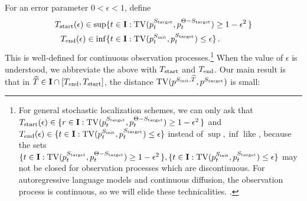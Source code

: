 For an error parameter $0 < \epsilon < 1$, define
\begin{align*} 
T_{\mathrm{start}}(\epsilon) \in \sup\{&t \in \mathbf{I}:\mathrm{TV}(p_{t}^{S_{\mathrm{target}}}  ,p_{t}^{\Theta-S_{\mathrm{target}} }) \geq 1-\epsilon^2\,\} \\
T_{\mathrm{end}}(\epsilon) \in  \inf\{&t \in  \mathbf{I}:  \mathrm{TV}(p_{t}^{S_{\mathrm{init}}  },p_{t}^{S_{\mathrm{target}} }) \leq \epsilon\}\,.
\end{align*} 
This is well-defined for continuous observation processes.\footnote{For general stochastic localization schemes, we can only ask that $T_{\mathrm{start}}(\epsilon) \in  \{ r\in \mathbf{I}:\mathrm{TV}(p_{t}^{S_{\mathrm{target}}} ,p_{t}^{\Theta-S_{\mathrm{target}} }) \geq 1-\epsilon^2\,\}$ and $T_{\mathrm{end}}(\epsilon) \in  \{t \in  \mathbf{I}:  \mathrm{TV}(p_{t}^{S_{\mathrm{init}}  },p_{t}^{S_{\mathrm{target}} }) \leq \epsilon\}$ instead of $\sup,\inf$ like \citep{li2024criticalwindowsnonasymptotictheory}, because the sets $ \{t \in \mathbf{I}:\mathrm{TV}(p_{t}^{S_{\mathrm{target}}}  ,p_{t}^{\Theta-S_{\mathrm{target}} }) \geq 1-\epsilon^2\,\},\{t \in  \mathbf{I}:  \mathrm{TV}(p_{t}^{S_{\mathrm{init}}  },p_{t}^{S_{\mathrm{target}} }) \leq \epsilon\}$ may not be closed for observation processes which are discontinuous. For autoregressive language models and continuous diffusion, the observation process is continuous, so we will elide these technicalities.
.} When the value of $\epsilon$ is understood, we abbreviate the above with $T_{\mathrm{start}}$ and $T_{\mathrm{end}}$.  Our main result is that in $\widehat{T}\in \mathbf{I} \cap [T_{\mathrm{end}},T_{\mathrm{start}}]$, the distance $\TV(\modrevlaw{\Sinit}{\wh{T}}{}, p^{\Send})$ is small:

